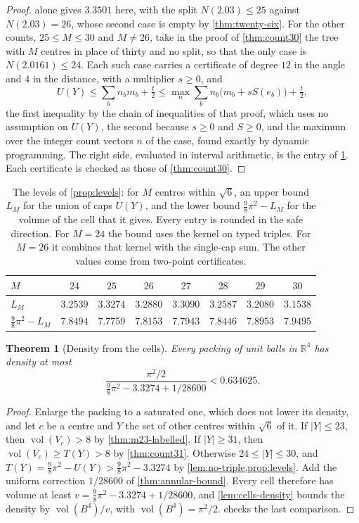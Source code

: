 \documentclass[11pt,reqno]{amsart}
\renewcommand{\_}{\origunderscore\allowbreak}
\numberwithin{equation}{section}
\theoremstyle{plain}
\newtheorem{thm}{Theorem}[section]
\theoremstyle{definition}
\theoremstyle{remark}
\DeclareMathOperator{\vol}{vol}
\begin{document}
\begin{proof}
alone gives $3.3501$ here, with the split $N(2.03)\le25$ against
$N(2.03)=26$, whose second case is empty by \cref{thm:twenty-six}. For the
other counts, $25\le M\le30$ and $M\ne26$, take in
the proof of \cref{thm:count30} the tree with $M$ centres in place of thirty
and no split, so that the only case is $N(2.0161)\le24$. Each such case
carries a certificate of degree $12$ in the angle and $4$ in the distance,
with a multiplier $s\ge0$, and
\[
  U(Y)\le\sum_bn_bm_b+\tfrac t2\le\max_n\sum_bn_b\bigl(m_b+sS(e_b)\bigr)+\tfrac t2,
\]
the first inequality by the chain of inequalities of that proof, which
uses no assumption on $U(Y)$, the second because $s\ge0$ and $S\ge0$, and
the maximum over the integer count vectors $n$ of the case, found exactly
by dynamic programming. The right side, evaluated in interval arithmetic,
is the entry of \cref{tab:levels}. Each certificate is checked as those of
\cref{thm:count30}.
\end{proof}

\begin{table}[tb]
\centering
\caption{The levels of \cref{prop:levels}: for $M$ centres within $\sqrt6$,
an upper bound $L_M$ for the union of caps $U(Y)$, and the lower bound
$\frac98\pi^2-L_M$ for the volume of the cell that it gives. Every entry is
rounded in the safe direction. For $M=24$ the bound uses the kernel on
typed triples. For $M=26$ it combines that kernel with the single-cap sum.
The other values come from two-point certificates.}
\label{tab:levels}
\begin{tabular}{@{}lccccccc@{}}
\toprule
$M$ & $24$ & $25$ & $26$ & $27$ & $28$ & $29$ & $30$\\
\midrule
$L_M$ & $3.2539$ & $3.3274$ & $3.2880$ & $3.3090$ & $3.2587$ & $3.2080$ & $3.1538$\\
$\frac98\pi^2-L_M$ & $7.8494$ & $7.7759$ & $7.8153$ & $7.7943$ & $7.8446$ & $7.8953$ & $7.9495$\\
\bottomrule
\end{tabular}
\end{table}

\begin{thm}[Density from the cells]\label{thm:density-cells}
Every packing of unit balls in $\mathbb{R}^4$ has density at most
\[
  \frac{\pi^2/2}{\frac98\pi^2-3.3274+1/28600}<0.634625 .
\]
\end{thm}

\begin{proof}
Enlarge the packing to a saturated one, which does not lower its density,
and let $c$ be a centre and $Y$ the set of other centres within $\sqrt6$ of
it. If $|Y|\le23$, then $\vol(V_c)>8$ by \cref{thm:m23-labelled}. If
$|Y|\ge31$, then $\vol(V_c)\ge T(Y)>8$ by \cref{thm:count31}. Otherwise
$24\le|Y|\le30$, and $T(Y)=\frac98\pi^2-U(Y)>\frac98\pi^2-3.3274$
by \cref{lem:no-triple,prop:levels}. Add the uniform correction
$1/28600$ of \cref{thm:annular-bound}. Every cell therefore has volume at
least $v=\frac98\pi^2-3.3274+1/28600$, and \cref{lem:cells-density} bounds
the density by $\vol(B^4)/v$, with $\vol(B^4)=\pi^2/2$.
 checks the last comparison.
\end{proof}
\end{document}
